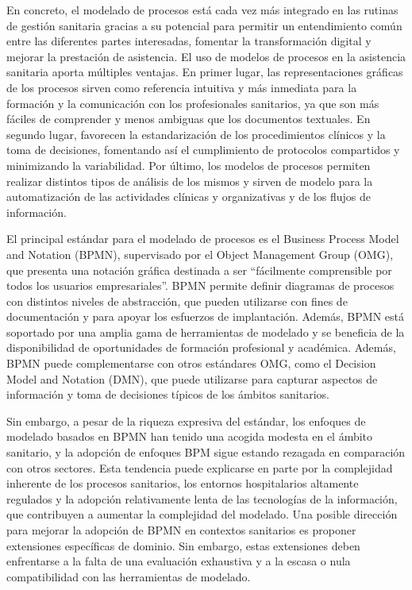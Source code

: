 En concreto, el modelado de procesos está cada vez más integrado en las rutinas de gestión sanitaria gracias a su potencial para permitir un entendimiento común entre las diferentes partes interesadas, fomentar la transformación digital y mejorar la prestación de asistencia.
El uso de modelos de procesos en la asistencia sanitaria aporta múltiples ventajas.
En primer lugar, las representaciones gráficas de los procesos sirven como referencia intuitiva y más inmediata para la formación y la comunicación con los profesionales sanitarios, ya que son más fáciles de comprender y menos ambiguas que los documentos textuales.
En segundo lugar, favorecen la estandarización de los procedimientos clínicos y la toma de decisiones, fomentando así el cumplimiento de protocolos compartidos y minimizando la variabilidad.
Por último, los modelos de procesos permiten realizar distintos tipos de análisis de los mismos y sirven de modelo para la automatización de las actividades clínicas y organizativas y de los flujos de información.

El principal estándar para el modelado de procesos es el Business Process Model and Notation (BPMN), supervisado por el Object Management Group (OMG), que presenta una notación gráfica destinada a ser ``fácilmente comprensible por todos los usuarios empresariales''. BPMN permite definir diagramas de procesos con distintos niveles de abstracción, que pueden utilizarse con fines de documentación y para apoyar los esfuerzos de implantación. Además, BPMN está soportado por una amplia gama de herramientas de modelado y se beneficia de la disponibilidad de oportunidades de formación profesional y académica. Además, BPMN puede complementarse con otros estándares OMG, como el Decision Model and Notation (DMN), que puede utilizarse para capturar aspectos de información y toma de decisiones típicos de los ámbitos sanitarios.

Sin embargo, a pesar de la riqueza expresiva del estándar, los enfoques de modelado basados en BPMN han tenido una acogida modesta en el ámbito sanitario, y la adopción de enfoques BPM sigue estando rezagada en comparación con otros sectores. Esta tendencia puede explicarse en parte por la complejidad inherente de los procesos sanitarios, los entornos hospitalarios altamente regulados y la adopción relativamente lenta de las tecnologías de la información, que contribuyen a aumentar la complejidad del modelado. Una posible dirección para mejorar la adopción de BPMN en contextos sanitarios es proponer extensiones específicas de dominio. Sin embargo, estas extensiones deben enfrentarse a la falta de una evaluación exhaustiva y a la escasa o nula compatibilidad con las herramientas de modelado.

